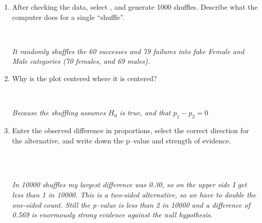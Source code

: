 \begin{enumerate}
\begin{enumerate}
   \item After checking the data, select , and generate  1000
     shuffles. Describe what the  computer does for a single
     ``shuffle''. 
\begin{students}
 \ \   \vspace*{3cm}\\
\end{students}
\begin{key}
  {\it  It randomly shuffles the 60 successes and 79 failures into
    fake Female and Male categories (70 females, and 69 males).}
\end{key}

\item Why is the plot centered where it is centered?
\begin{students}
 \ \   \vspace{2cm}\\
\end{students}
\begin{key}
  {\it  Because the shuffling assumes $H_0$ is true, and that $p_1-p_2
    = 0$}
\end{key}



   \item Enter the observed difference in proportions, select the
     correct direction for the alternative, and write down the
     p--value   and strength of evidence. 
\begin{students}
 \\   \vspace{2cm}\\
\end{students}
\begin{key}
  {\it In 10000 shuffles my largest difference was 0.30, so on the
    upper side I get less than 1 in 10000. This is a two-sided
    alternative, so we have to double the one-sided count. Still the p--value
    is less than 2 in 10000 and a difference of 0.569 is enormously strong 
  evidence against the null hypothesis.    } \\
\end{key}


\end{enumerate}
\end{enumerate}
